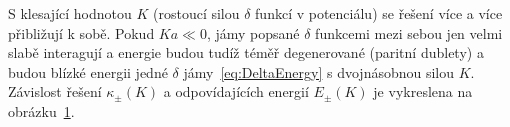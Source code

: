 \begin{solution}
\begin{enumerate}
		\begin{figure}[!htbp]
            \begin{subfigure}{0.49\linewidth}
                \centering{}
            \end{subfigure}
            \hfill
            \begin{subfigure}{0.49\linewidth}
                \centering{}
            \end{subfigure}
			\label{fig:DoubleDeltaLevelDynamics}
		\end{figure}		

		S klesající hodnotou $K$ (rostoucí silou $\delta$ funkcí v potenciálu) se řešení více a více přibližují k sobě.
		Pokud $Ka\ll0$, jámy popsané $\delta$ funkcemi mezi sebou jen velmi slabě interagují a energie budou tudíž téměř degenerované (paritní dublety) a budou blízké energii jedné $\delta$ jámy~\eqref{eq:DeltaEnergy} s dvojnásobnou silou $K$.
        Závislost řešení $\kappa_{\pm}(K)$ a odpovídajících energií $E_{\pm}(K)$ je vykreslena na obrázku~\ref{fig:DoubleDeltaLevelDynamics}.
		

\end{enumerate}
\end{solution}
